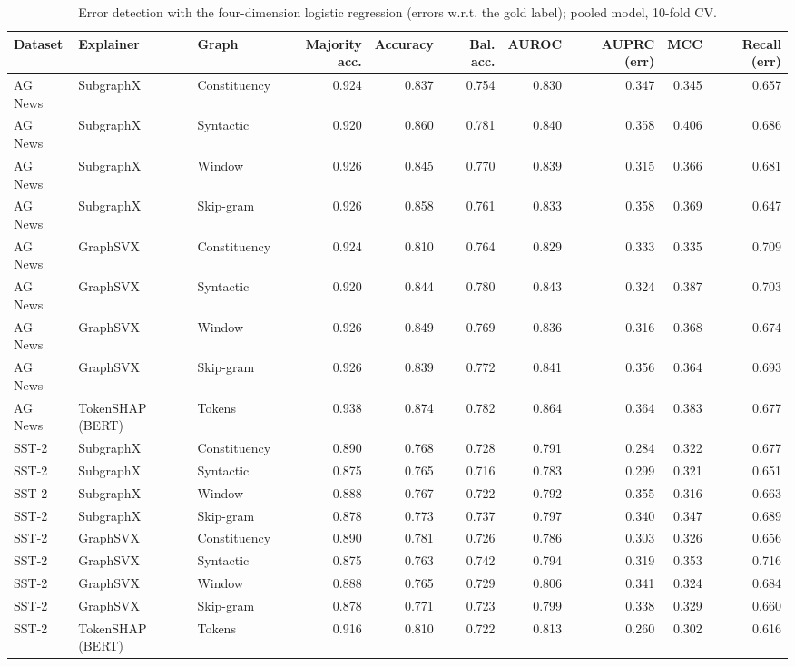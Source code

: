 \begin{table}[H]
\centering
\small
\caption{Error detection with the four-dimension logistic regression (errors w.r.t. the gold label); pooled model, 10-fold CV.}
\label{tab:lr_gold_label}
\begin{tabular}{lllrrrrrrr}
\toprule
Dataset & Explainer & Graph & Majority acc. & Accuracy & Bal. acc. & AUROC & AUPRC (err) & MCC & Recall (err) \\
\midrule
AG News & SubgraphX & Constituency & 0.924 & 0.837 & 0.754 & 0.830 & 0.347 & 0.345 & 0.657 \\
AG News & SubgraphX & Syntactic & 0.920 & 0.860 & 0.781 & 0.840 & 0.358 & 0.406 & 0.686 \\
AG News & SubgraphX & Window & 0.926 & 0.845 & 0.770 & 0.839 & 0.315 & 0.366 & 0.681 \\
AG News & SubgraphX & Skip-gram & 0.926 & 0.858 & 0.761 & 0.833 & 0.358 & 0.369 & 0.647 \\
AG News & GraphSVX & Constituency & 0.924 & 0.810 & 0.764 & 0.829 & 0.333 & 0.335 & 0.709 \\
AG News & GraphSVX & Syntactic & 0.920 & 0.844 & 0.780 & 0.843 & 0.324 & 0.387 & 0.703 \\
AG News & GraphSVX & Window & 0.926 & 0.849 & 0.769 & 0.836 & 0.316 & 0.368 & 0.674 \\
AG News & GraphSVX & Skip-gram & 0.926 & 0.839 & 0.772 & 0.841 & 0.356 & 0.364 & 0.693 \\
AG News & TokenSHAP (BERT) & Tokens & 0.938 & 0.874 & 0.782 & 0.864 & 0.364 & 0.383 & 0.677 \\
SST-2 & SubgraphX & Constituency & 0.890 & 0.768 & 0.728 & 0.791 & 0.284 & 0.322 & 0.677 \\
SST-2 & SubgraphX & Syntactic & 0.875 & 0.765 & 0.716 & 0.783 & 0.299 & 0.321 & 0.651 \\
SST-2 & SubgraphX & Window & 0.888 & 0.767 & 0.722 & 0.792 & 0.355 & 0.316 & 0.663 \\
SST-2 & SubgraphX & Skip-gram & 0.878 & 0.773 & 0.737 & 0.797 & 0.340 & 0.347 & 0.689 \\
SST-2 & GraphSVX & Constituency & 0.890 & 0.781 & 0.726 & 0.786 & 0.303 & 0.326 & 0.656 \\
SST-2 & GraphSVX & Syntactic & 0.875 & 0.763 & 0.742 & 0.794 & 0.319 & 0.353 & 0.716 \\
SST-2 & GraphSVX & Window & 0.888 & 0.765 & 0.729 & 0.806 & 0.341 & 0.324 & 0.684 \\
SST-2 & GraphSVX & Skip-gram & 0.878 & 0.771 & 0.723 & 0.799 & 0.338 & 0.329 & 0.660 \\
SST-2 & TokenSHAP (BERT) & Tokens & 0.916 & 0.810 & 0.722 & 0.813 & 0.260 & 0.302 & 0.616 \\
\bottomrule
\end{tabular}
\end{table}

